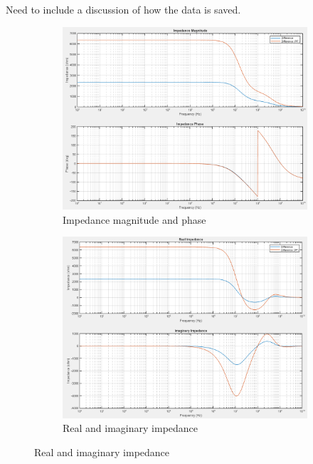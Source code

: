 \par Need to include a discussion of how the data is saved.

\begin{figure}[h]
    \centering
    \begin{subfigure}[b]{0.45\textwidth}
        \centering
        \includegraphics[width=\textwidth]{images/IS_APP_mag_phase.png}
        \caption{Impedance magnitude and phase}
    \end{subfigure}
    \hfill
    \begin{subfigure}[b]{0.45\textwidth}
        \centering
        \includegraphics[width=\textwidth]{images/IS_APP_real_imag.png}
        \caption{Real and imaginary impedance}
    \end{subfigure}

\end{figure}
